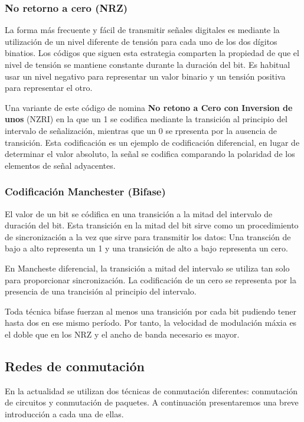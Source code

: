 \subsubsection*{No retorno a cero (NRZ)}
La forma más frecuente y fácil de transmitir señales digitales es mediante la utilización de un nivel diferente de tensión para cada uno de los dos dígitos binatios. Los códigos que siguen esta estrategia comparten la propiedad de que el nivel de tensión se mantiene constante durante la duración del bit. Es habitual usar un nivel negativo para representar un valor binario y un tensión positiva para representar el otro.

Una variante de este código de nomina \textbf{No retono a Cero con Inversion de unos} (NZRI) en la que un 1 se codifica mediante la transición al principio del intervalo de señalización, mientras que un 0 se rpresenta por la ausencia de transición. Esta codificación es un ejemplo de codificación diferencial, en lugar de determinar el valor absoluto, la señal se codifica comparando la polaridad de los elementos de señal adyacentes.

\subsubsection*{Codificación Manchester (Bifase)}
El valor de un bit se códifica en una transición a la mitad del intervalo de duración del bit. Esta transición en la mitad del bit sirve como un procedimiento de sincronización a la vez que sirve para transmitir los datos: Una transción de bajo a alto representa un 1 y una transición de alto a bajo representa un cero.

En Mancheste diferencial, la transición a mitad del intervalo se utiliza tan solo para proporcionar sincronización. La codificación de un cero se representa por la presencia de una trancisión al principio del intervalo. 

Toda técnica bifase fuerzan al menos una transición por cada bit pudiendo tener hasta dos en ese mismo período. Por tanto, la velocidad de modulación máxia es el doble que en los NRZ y el ancho de banda necesario es mayor.

\subsection{Redes de conmutación}
En la actualidad se utilizan dos técnicas de conmutación diferentes: conmutación de circuitos y conmutación de paquetes. A continuación presentaremos una breve introducción a cada una de ellas.

